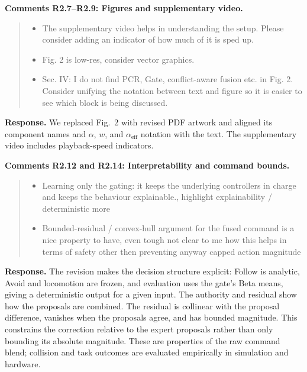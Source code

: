 \documentclass[letterpaper,11pt]{article}
\begin{document}
\noindent\textbf{Comments R2.7--R2.9: Figures and supplementary video.}
\begin{quote}\color{reviewgray}
\begin{itemize}[leftmargin=*,nosep,label={}]
\item[\textbf{R2.7.}] The supplementary video helps in understanding the setup. Please consider adding an indicator of how much of it is sped up.
\item[\textbf{R2.8.}] Fig. 2 is low-res, consider vector graphics.
\item[\textbf{R2.9.}] Sec. IV: I do not find PCR, Gate, conflict-aware fusion etc. in Fig. 2. Consider unifying the notation between text and figure so it is easier to see which block is being discussed.
\end{itemize}
\end{quote}
\noindent\textbf{Response.}
We replaced Fig.~2 with revised PDF artwork and aligned its component names and $\alpha$, $w$, and $\alpha_{\mathrm{eff}}$ notation with the text. The supplementary video includes playback-speed indicators.
\par\nopagebreak[4]


\noindent\textbf{Comments R2.12 and R2.14: Interpretability and command bounds.}
\begin{quote}\color{reviewgray}
\begin{itemize}[leftmargin=*,nosep,label={}]
\item[\textbf{R2.12.}] Learning only the gating: it keeps the underlying controllers in charge and keeps the behaviour explainable., highlight explainability / deterministic more
\item[\textbf{R2.14.}] Bounded-residual / convex-hull argument for the fused command is a nice property to have, even tough not clear to me how this helps in terms of safety other then preventing anyway capped action magnitude
\end{itemize}
\end{quote}
\noindent\textbf{Response.}
The revision makes the decision structure explicit: Follow is analytic, Avoid and locomotion are frozen, and evaluation uses the gate's Beta means, giving a deterministic output for a given input. The authority and residual show how the proposals are combined. The residual is collinear with the proposal difference, vanishes when the proposals agree, and has bounded magnitude. This constrains the correction relative to the expert proposals rather than only bounding its absolute magnitude. These are properties of the raw command blend; collision and task outcomes are evaluated empirically in simulation and hardware.
\par\nopagebreak[4]
\end{document}
